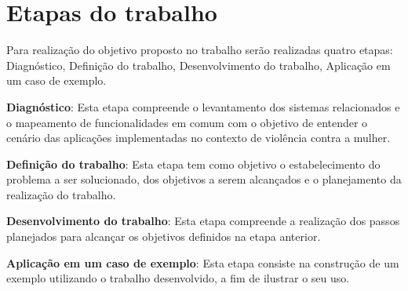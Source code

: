 \section{Etapas do trabalho}


Para realização do objetivo proposto no trabalho serão realizadas quatro etapas: 
Diagnóstico, Definição do trabalho, Desenvolvimento do trabalho, Aplicação em um caso de exemplo.

\noindent \textbf{Diagnóstico}: Esta etapa compreende o levantamento dos sistemas relacionados e o mapeamento
de funcionalidades em comum com o objetivo de entender o cenário das aplicações implementadas no contexto
de violência contra a mulher.

\noindent \textbf{Definição do trabalho}: Esta etapa tem como objetivo o estabelecimento do problema a ser solucionado, dos objetivos a serem alcançados e o planejamento da realização do trabalho.

\noindent \textbf{Desenvolvimento do trabalho}: Esta etapa compreende a realização dos passos planejados para 
alcançar os objetivos definidos na etapa anterior.

\noindent \textbf{Aplicação em um caso de exemplo}: Esta etapa consiste na construção de um exemplo utilizando o
trabalho desenvolvido, a fim de ilustrar o seu uso.







